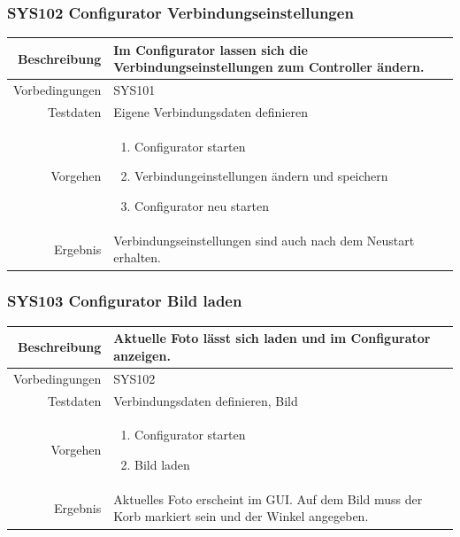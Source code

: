 \subsubsection{SYS102 Configurator Verbindungseinstellungen }
\begin{table}[h!]
	\renewcommand{\arraystretch}{1.5}
	\begin{tabular}{|r|p{14cm}|}
		\hline Beschreibung & Im Configurator lassen sich die Verbindungseinstellungen zum Controller ändern. \\ 
		\hline Vorbedingungen & SYS101 \\ 
		\hline Testdaten & Eigene Verbindungsdaten definieren \\ 
		\hline Vorgehen & 
		\begin{enumerate}
			\item Configurator starten
			\item Verbindungeinstellungen ändern und speichern
			\item Configurator neu starten
		\end{enumerate} \\ 
		\hline Ergebnis & Verbindungseinstellungen sind auch nach dem Neustart erhalten. \\ 
		\hline 
	\end{tabular}
\end{table}

\subsubsection{SYS103 Configurator Bild laden }
\begin{table}[h!]
	\renewcommand{\arraystretch}{1.5}
	\begin{tabular}{|r|p{14cm}|}
		\hline Beschreibung & Aktuelle Foto lässt sich laden und im Configurator anzeigen. \\ 
		\hline Vorbedingungen & SYS102 \\ 
		\hline Testdaten & Verbindungsdaten definieren, Bild \\ 
		\hline Vorgehen & 
		\begin{enumerate}
			\item Configurator starten
			\item Bild laden
		\end{enumerate} \\ 
		\hline Ergebnis & Aktuelles Foto erscheint im GUI. Auf dem Bild muss der Korb markiert sein und der Winkel angegeben. \\ 
		\hline 
	\end{tabular}
\end{table}


